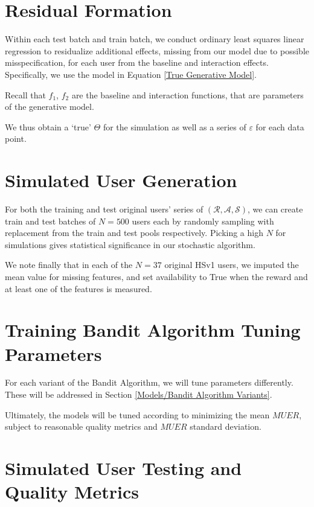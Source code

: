 \section{Residual Formation}

Within each test batch and train batch, we conduct ordinary least squares linear regression to residualize additional effects, missing from our model due to possible misspecification, for each user from the baseline and interaction effects.  Specifically, we use the model in Equation \ref{True Generative Model}.

Recall that $f_1$, $f_2$ are the baseline and interaction functions, that are parameters of the generative model.

We thus obtain a `true' $\Theta$ for the simulation as well as a series of $\varepsilon$ for each data point.


\section{Simulated User Generation}

For both the training and test original users' series of $(\mathcal{R}, \mathcal{A}, \mathcal{S})$, we can create train and test batches of $N = 500$ users each by randomly sampling with replacement from the train and test pools respectively.  Picking a high $N$ for simulations gives statistical significance in our stochastic algorithm.  

We note finally that in each of the $N = 37$ original HSv1 users, we imputed the mean value for missing features, and set availability to True when the reward and at least one of the features is measured.




\section{Training Bandit Algorithm Tuning Parameters}

For each variant of the Bandit Algorithm, we will tune parameters differently.  These will be addressed in Section \ref{Models/Bandit Algorithm Variants}.

Ultimately, the models will be tuned according to minimizing the mean $MUER$, subject to reasonable quality metrics and $MUER$ standard deviation.


\section{Simulated User Testing and Quality Metrics}

